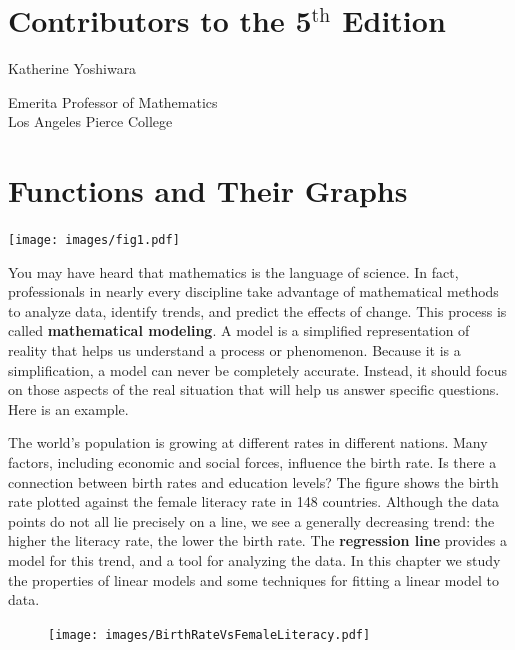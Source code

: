 \documentclass[10pt,]{book}
\newcommand{\terminology}[1]{\textbf{#1}}
\theoremstyle{plain}
\theoremstyle{definition}
\theoremstyle{definition}
\theoremstyle{definition}
\theoremstyle{definition}
\theoremstyle{definition}
\numberwithin{equation}{section}
\begin{document}
\chapter*{Contributors to the 5\(^\mathrm{th}\) Edition}\label{preface-2}
\hypertarget{kyoshiwara}{}\noindent%
\parbox[t]{0.35\textwidth}{Katherine Yoshiwara}%
\parbox[t]{0.65\textwidth}{Emerita Professor of Mathematics\\Los Angeles Pierce College\\}\par
\setcounter{tocdepth}{1}
\renewcommand*\contentsname{Contents}
\tableofcontents
\mainmatter
\typeout{************************************************}
\typeout{************************************************}
\chapter[Functions and Their Graphs]{Functions and Their Graphs}\label{chap1}
\typeout{************************************************}
\typeout{************************************************}
\texttt{[image: images/fig1.pdf]}%
\par
You may have heard that mathematics is the language of science.  In fact, professionals in nearly every discipline take advantage of mathematical methods to analyze data, identify trends, and predict the effects of change.  This process is called \terminology{mathematical modeling}.  A model is a simplified representation of reality that helps us understand a process or phenomenon.  Because it is a simplification, a model can never be completely accurate.  Instead, it should focus on those aspects of the real situation that will help us answer specific questions. Here is an example. %
\par
The world's population is growing at different rates in different nations.  Many factors, including economic and social forces, influence the birth rate.  Is there a connection between birth rates and education levels?  The figure shows the birth rate plotted against the female literacy rate in 148 countries.  Although the data points do not all lie precisely on a line, we see a generally decreasing trend:  the higher the literacy rate, the lower the birth rate.  The \terminology{regression line} provides a model for this trend, and a tool for analyzing the data.  In this chapter we study the properties of linear models and some techniques for fitting a linear model to data.%
\leavevmode%
\begin{figure}
\centering
\texttt{[image: images/BirthRateVsFemaleLiteracy.pdf]}\end{figure}
\typeout{************************************************}
\typeout{************************************************}
\end{document}
